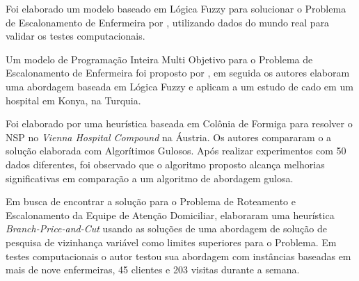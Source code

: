Foi elaborado um modelo baseado em Lógica Fuzzy para solucionar o Problema de Escalonamento de Enfermeira por \cite{topaloglu:2010}, utilizando dados do mundo real para validar os testes computacionais. 

Um modelo de Programação Inteira Multi Objetivo para o Problema de Escalonamento de Enfermeira foi proposto por \cite{cetin:2015}, em seguida os autores elaboram uma abordagem baseada em Lógica Fuzzy e aplicam a um estudo de cado em um hospital em Konya, na Turquia.

Foi elaborado por \cite{gutjahra:2007} uma heurística baseada em Colônia de Formiga para resolver o \ac{NSP} no \textit{Vienna Hospital Compound} na Áustria. Os autores compararam o a solução elaborada com Algorítimos Gulosos. Após realizar experimentos com 50 dados diferentes, foi observado que o algoritmo proposto alcança melhorias significativas em comparação a um algoritmo de abordagem gulosa.

Em busca de encontrar a solução para o Problema de Roteamento e Escalonamento da Equipe de Atenção Domiciliar, \cite{trautsamwieser:2014} elaboraram uma heurística  \textit{Branch-Price-and-Cut} usando as soluções de uma abordagem de solução de pesquisa de vizinhança variável como limites superiores para o Problema. Em testes computacionais o autor testou sua abordagem com instâncias baseadas em mais de nove enfermeiras, 45 clientes e 203 visitas durante a semana.






